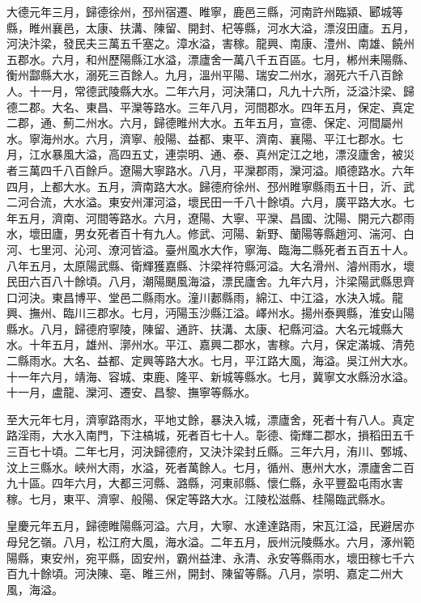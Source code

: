 \begin{pinyinscope}
 大德元年三月，歸德徐州，邳州宿遷、睢寧，鹿邑三縣，河南許州臨潁、郾城等縣，睢州襄邑，太康、扶溝、陳留、開封、杞等縣，河水大溢，漂沒田廬。五月，河決汴梁，發民夫三萬五千塞之。漳水溢，害稼。龍興、南康、澧州、南雄、饒州五郡水。六月，和州歷陽縣江水溢，漂廬舍一萬八千五百區。七月，郴州耒陽縣、衡州酃縣大水，溺死三百餘人。九月，溫州平陽、瑞安二州水，溺死六千八百餘人。十一月，常德武陵縣大水。二年六月，河決蒲口，凡九十六所，泛溢汴梁、歸德二郡。大名、東昌、平灤等路水。三年八月，河間郡水。四年五月，保定、真定二郡，通、薊二州水。六月，歸德睢州大水。五年五月，宣德、保定、河間屬州水。寧海州水。六月，濟寧、般陽、益都、東平、濟南、襄陽、平江七郡水。七月，江水暴風大溢，高四五丈，連崇明、通、泰、真州定江之地，漂沒廬舍，被災者三萬四千八百餘戶。遼陽大寧路水。八月，平灤郡雨，灤河溢。順德路水。六年四月，上都大水。五月，濟南路大水。歸德府徐州、邳州睢寧縣雨五十日，沂、武二河合流，大水溢。東安州渾河溢，壞民田一千八十餘頃。六月，廣平路大水。七年五月，濟南、河間等路水。六月，遼陽、大寧、平灤、昌國、沈陽、開元六郡雨水，壞田廬，男女死者百十有九人。修武、河陽、新野、蘭陽等縣趙河、湍河、白河、七里河、沁河、潦河皆溢。臺州風水大作，寧海、臨海二縣死者五百五十人。八年五月，太原陽武縣、衛輝獲嘉縣、汴梁祥符縣河溢。大名滑州、濬州雨水，壞民田六百八十餘頃。八月，潮陽颶風海溢，漂民廬舍。九年六月，汴梁陽武縣思齊口河決。東昌博平、堂邑二縣雨水。潼川郪縣雨，綿江、中江溢，水決入城。龍興、撫州、臨川三郡水。七月，沔陽玉沙縣江溢。嶧州水。揚州泰興縣，淮安山陽縣水。八月，歸德府寧陵，陳留、通許、扶溝、太康、杞縣河溢。大名元城縣大水。十年五月，雄州、漷州水。平江、嘉興二郡水，害稼。六月，保定滿城、清苑二縣雨水。大名、益都、定興等路大水。七月，平江路大風，海溢。吳江州大水。十一年六月，靖海、容城、束鹿、隆平、新城等縣水。七月，冀寧文水縣汾水溢。十一月，盧龍、灤河、遷安、昌黎、撫寧等縣水。



 至大元年七月，濟寧路雨水，平地丈餘，暴決入城，漂廬舍，死者十有八人。真定路淫雨，大水入南門，下注槁城，死者百七十人。彰德、衛輝二郡水，損稻田五千三百七十頃。二年七月，河決歸德府，又決汴梁封丘縣。三年六月，洧川、鄄城、汶上三縣水。峽州大雨，水溢，死者萬餘人。七月，循州、惠州大水，漂廬舍二百九十區。四年六月，大都三河縣、潞縣，河東祁縣、懷仁縣，永平豐盈屯雨水害稼。七月，東平、濟寧、般陽、保定等路大水。江陵松滋縣、桂陽臨武縣水。



 皇慶元年五月，歸德睢陽縣河溢。六月，大寧、水達達路雨，宋瓦江溢，民避居亦母兒乞嶺。八月，松江府大風，海水溢。二年五月，辰州沅陵縣水。六月，涿州範陽縣，東安州，宛平縣，固安州，霸州益津、永清、永安等縣雨水，壞田稼七千六百九十餘頃。河決陳、亳、睢三州，開封、陳留等縣。八月，崇明、嘉定二州大風，海溢。




\end{pinyinscope}
